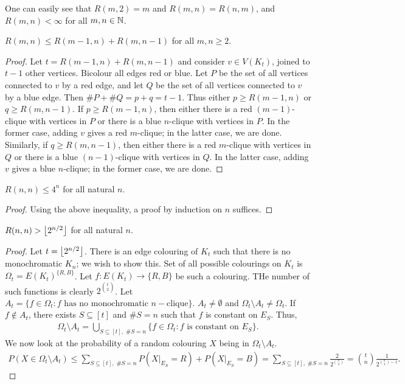 One can easily see that $R(m,2) = m$ and $R(m,n) = R(n,m)$, and $R(m,n) < \infty$ for all $m,n \in \mathbb{N}$.

\begin{lemma}
    $R(m,n) \leq R(m-1,n) + R(m,n-1)$ for all $m,n \geq 2$.
\end{lemma}
\begin{proof}
    Let $t = R(m-1,n) + R(m,n-1)$ and consider $v \in V(K_{t})$, joined to $t-1$ other vertices. Bicolour all edges red or blue. Let $P$ be the set of all vertices connected to $v$ by a red edge, and let $Q$ be the set of all vertices connected to $v$ by a blue edge. Then $\#P + \#Q = p+q = t-1$. Thus either $p \geq R(m-1,n)$ or $q \geq R(m,n-1)$. If $p \geq R(m-1,n)$, then either there is a red $(m-1)$-clique with vertices in $P$ or there is a blue $n$-clique with vertices in $P$. In the former case, adding $v$ gives a red $m$-clique; in the latter case, we are done. Similarly, if $q \geq R(m,n-1)$, then either there is a red $m$-clique with vertices in $Q$ or there is a blue $(n-1)$-clique with vertices in $Q$. In the latter case, adding $v$ gives a blue $n$-clique; in the former case, we are done.
\end{proof}

\begin{lemma}
    $R(n,n) \leq 4^{n}$ for all natural $n$.
\end{lemma}
\begin{proof}
    Using the above inequality, a proof by induction on $n$ suffices.
\end{proof}

\begin{lemma}
    $R(n,n) > \left\lfloor 2^{n/2} \right\rfloor$ for all natural $n$.
\end{lemma}
\begin{proof}
    Let $t = \left\lfloor 2^{n/2} \right\rfloor$. There is an edge colouring of $K_{t}$ such that there is no monochromatic $K_{n}$; we wish to show this. Set of all possible colourings on $K_{t}$ is $\Omega_{t} = E(K_{t})^{\{R,B\}}$. Let $f:E(K_{t}) \to \{R,B\}$ be such a colouring. THe number of such functions is clearly $2^{\binom{t}{2}}$. Let $A_{t} = \{f \in \Omega_{t} : f \text{ has no monochromatic } n-\text{clique}\}$. $A_{t} \neq\emptyset$ and $\Omega_{t} \setminus A_{t} \neq \Omega_{t}$. If $f \notin A_{t}$, there exists $S \subseteq [t]$ and $\#S = n$ such that $f$ is constant on $E_{S}$. Thus,
    \begin{align}
        \Omega_{t} \setminus A_{t} = \bigcup_{S \subseteq [t],\; \#S = n} \{f \in \Omega_{t} : f \text{ is constant on } E_{S}\}.
    \end{align}
    We now look at the probability of a random colouring $X$ being in $\Omega_{t} \setminus A_{t}$.
    \begin{align}
        P(X \in \Omega_{t} \setminus A_{t}) \leq \sum_{S \subseteq [t],\; \#S = n} P(X|_{E_{S}} = R) + P(X|_{E_{S}} = B) = \sum_{S \subseteq [t],\; \#S = n} \frac{2}{2^{\binom{n}{2}}} = \binom{t}{n} \frac{1}{2^{\binom{n}{2}-1}}.
    \end{align}
    
\end{proof}